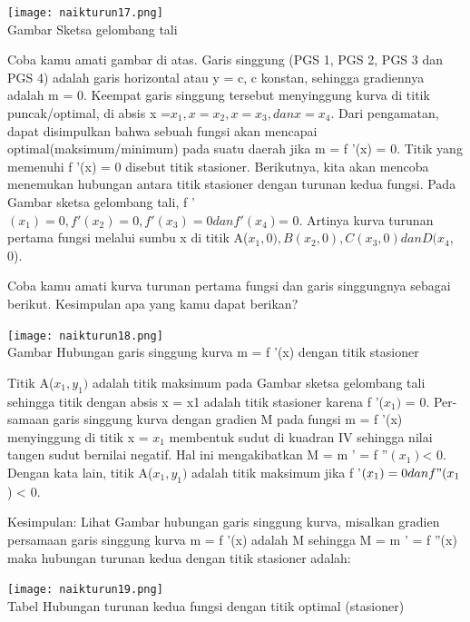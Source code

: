 \documentclass[11pt,fleqn]{book} %
\begin{document}
\begin{center}
\texttt{[image: naikturun17.png]}\\
Gambar Sketsa gelombang tali
\end{center}

Coba kamu amati gambar di atas. Garis singgung
(PGS 1, PGS 2, PGS 3 dan PGS 4) adalah garis horizontal atau y = c, c konstan, sehingga gradiennya
adalah m = 0. Keempat garis singgung tersebut menyinggung kurva di titik puncak/optimal, di absis x =$ x_{1}, x = x_{2}, x = x_{3}, dan x = x_{4}$. Dari pengamatan, dapat disimpulkan bahwa sebuah fungsi akan mencapai optimal(maksimum/minimum) pada suatu daerah jika m = f '(x) = 0. Titik yang memenuhi f '(x) = 0 disebut titik stasioner. Berikutnya, kita akan mencoba menemukan hubungan antara titik stasioner dengan turunan kedua fungsi. Pada Gambar sketsa gelombang tali, f '$(x_{1}) = 0, f '(x_{2}) = 0, f '(x_{3}) = 0 dan f '(x_{4}) $= 0. Artinya kurva turunan pertama fungsi melalui sumbu x di titik A($x_{1}, 0), B(x_{2}, 0), C(x_{3}, 0) dan D(x_{4}$, 0).

Coba kamu amati kurva turunan pertama fungsi dan
garis singgungnya sebagai berikut. Kesimpulan apa
yang kamu dapat berikan?

\begin{center}
\texttt{[image: naikturun18.png]}\\
Gambar Hubungan garis singgung kurva m = f '(x)
dengan titik stasioner
\end{center}

Titik A($x_{1}, y_{1})$ adalah titik maksimum pada Gambar sketsa gelombang tali sehingga titik dengan absis x = x1 adalah titik stasioner karena f '($x_{1})$ = 0. Per-samaan garis singgung kurva dengan gradien M pada fungsi m = f '(x) menyinggung di titik x = $x_{1}$ membentuk sudut di kuadran IV sehingga nilai tangen sudut bernilai negatif. Hal ini mengakibatkan M = m ' = f ''$(x_{1}) $< 0. Dengan kata lain, titik A($x_{1}, y_{1})$ adalah titik maksimum jika f '$(x_{1}) = 0 dan f "(x_{1}$) < 0.

Kesimpulan: Lihat Gambar hubungan garis singgung kurva, misalkan gradien persamaan garis singgung kurva m = f '(x) adalah M sehingga M = m ' = f ''(x) maka hubungan turunan kedua dengan titik stasioner adalah:

\begin{center}
\texttt{[image: naikturun19.png]}\\
Tabel Hubungan turunan kedua fungsi dengan
titik optimal (stasioner)
\end{center}
\end{document}
